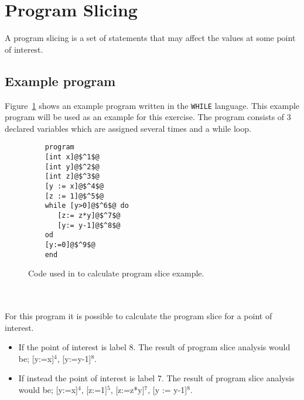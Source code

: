 \section{Program Slicing}
A program slicing is a set of statements that may affect the values at some point of interest.

\subsection{Example program}\label{sec:exampleprogram}
Figure~\ref{fig:codeexample} shows an example program written in the \texttt{WHILE} language. This example program will be used as an example for this exercise. The program consists of 3 declared variables which are assigned several times and a while loop.
\begin{figure}
	\begin{lstlisting}
	program
	[int x]@$^1$@
	[int y]@$^2$@
	[int z]@$^3$@
	[y := x]@$^4$@
	[z := 1]@$^5$@
	while [y>0]@$^6$@ do
	   [z:= z*y]@$^7$@
	   [y:= y-1]@$^8$@
	od
	[y:=0]@$^9$@
	end
	\end{lstlisting}
	\caption{Code used in to calculate program slice example.}
	\label{fig:codeexample}
\end{figure}
\\\\
For this program it is possible to calculate the program slice for a point of interest.
\begin{itemize}
	\item If the point of interest is label 8. The result of program slice analysis would be; [y:=x]$^4$, [y:=y-1]$^8$.
	\item If instead the point of interest is label 7.  The result of program slice analysis would be; [y:=x]$^4$, [z:=1]$^5$, [z:=z*y]$^7$, [y := y-1]$^8$.
\end{itemize}

